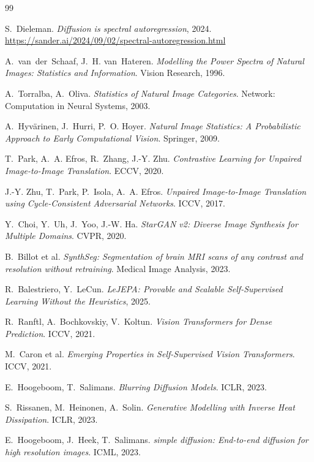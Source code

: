 \documentclass[11pt,a4paper]{article}
\begin{document}
\begin{thebibliography}{99}
\small

S.~Dieleman. \emph{Diffusion is spectral autoregression}, 2024.
\url{https://sander.ai/2024/09/02/spectral-autoregression.html}

A.~van~der~Schaaf, J.~H. van~Hateren. \emph{Modelling the Power Spectra of Natural Images: Statistics
and Information}. Vision Research, 1996.

A.~Torralba, A.~Oliva. \emph{Statistics of Natural Image Categories}. Network: Computation in Neural
Systems, 2003.

A.~Hyv\"arinen, J.~Hurri, P.~O. Hoyer. \emph{Natural Image Statistics: A Probabilistic Approach to
Early Computational Vision}. Springer, 2009.

T.~Park, A.~A. Efros, R.~Zhang, J.-Y. Zhu. \emph{Contrastive Learning for Unpaired Image-to-Image
Translation}. ECCV, 2020.

J.-Y. Zhu, T.~Park, P.~Isola, A.~A. Efros. \emph{Unpaired Image-to-Image Translation using
Cycle-Consistent Adversarial Networks}. ICCV, 2017.

Y.~Choi, Y.~Uh, J.~Yoo, J.-W. Ha. \emph{StarGAN v2: Diverse Image Synthesis for Multiple Domains}.
CVPR, 2020.

B.~Billot et al. \emph{SynthSeg: Segmentation of brain MRI scans of any contrast and resolution without
retraining}. Medical Image Analysis, 2023.

R.~Balestriero, Y.~LeCun. \emph{LeJEPA: Provable and Scalable Self-Supervised Learning Without the
Heuristics}, 2025.

R.~Ranftl, A.~Bochkovskiy, V.~Koltun. \emph{Vision Transformers for Dense Prediction}. ICCV, 2021.

M.~Caron et al. \emph{Emerging Properties in Self-Supervised Vision Transformers}. ICCV, 2021.

E.~Hoogeboom, T.~Salimans. \emph{Blurring Diffusion Models}. ICLR, 2023.

S.~Rissanen, M.~Heinonen, A.~Solin. \emph{Generative Modelling with Inverse Heat Dissipation}.
ICLR, 2023.

E.~Hoogeboom, J.~Heek, T.~Salimans. \emph{simple diffusion: End-to-end diffusion for high resolution
images}. ICML, 2023.


\end{thebibliography}
\end{document}

